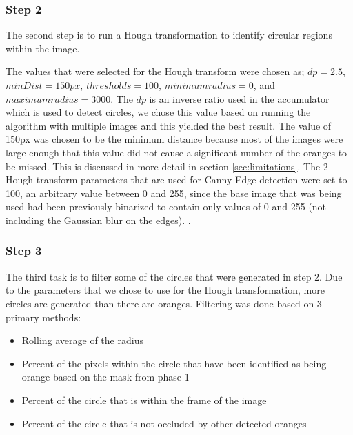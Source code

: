 \documentclass[conference]{IEEEtran}
\begin{document}
\subsubsection{Step 2} 
The second step is to run a Hough transformation to identify circular regions within the image.

The values that were selected for the Hough transform were chosen as; $dp = 2.5$, $minDist = 150px$, $thresholds = 100$, $minimum radius = 0$, and  $maximum radius = 3000$. The $dp$ is an inverse ratio used in the accumulator which is used to detect circles, we chose this value based on running the algorithm with multiple images and this yielded the best result. The value of 150px was chosen to be the minimum distance because most of the images were large enough that this value did not cause a significant number of the oranges to be missed. This is discussed in more detail in section \ref{sec:limitations}. The 2 Hough transform parameters that are used for Canny Edge detection were set to 100, an arbitrary value between 0 and 255, since the base image that was being used had been previously binarized to contain only values of 0 and 255 (not including the Gaussian blur on the edges). \cite{yadav_approach_2014}.


\subsubsection{Step 3}
The third task is to filter some of the circles that were generated in step 2. Due to the parameters that we chose to use for the Hough transformation, more circles are generated than there are oranges. Filtering was done based on 3 primary methods:

\begin{itemize}
\item Rolling average of the radius
\item Percent of the pixels within the circle that have been identified as being orange based on the mask from phase 1
\item Percent of the circle that is within the frame of the image
\item Percent of the circle that is not occluded by other detected oranges
\end{itemize}
\end{document}
